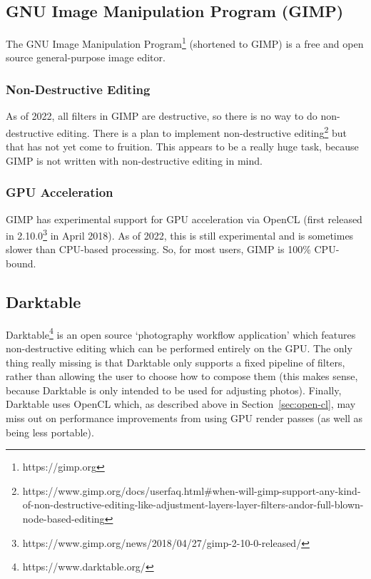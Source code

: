 \documentclass[12pt]{article}
\begin{document}
\subsection{GNU Image Manipulation Program (GIMP)}

The GNU Image Manipulation Program\footnote{https://gimp.org} (shortened to GIMP) is a free and open
source general-purpose image editor.

\subsubsection{Non-Destructive Editing}

As of 2022, all filters in GIMP are destructive, so there is no way to do non-destructive editing.
There is a plan to implement non-destructive
editing\footnote{https://www.gimp.org/docs/userfaq.html\#when-will-gimp-support-any-kind-of-non-destructive-editing-like-adjustment-layers-layer-filters-andor-full-blown-node-based-editing}
but that has not yet come to fruition.  This appears to be a really huge task, because GIMP is not
written with non-destructive editing in mind.

\subsubsection{GPU Acceleration}

GIMP has experimental support for GPU acceleration via OpenCL (first released in
2.10.0\footnote{https://www.gimp.org/news/2018/04/27/gimp-2-10-0-released/} in April 2018).  As of
2022, this is still experimental and is sometimes slower than CPU-based processing.  So, for most
users, GIMP is 100\% CPU-bound.

\subsection{Darktable}

Darktable\footnote{https://www.darktable.org/} is an open source `photography workflow application'
which features non-destructive editing which can be performed entirely on the GPU.  The only thing
really missing is that Darktable only supports a fixed pipeline of filters, rather than allowing the
user to choose how to compose them (this makes sense, because Darktable is only intended to be used
for adjusting photos).  Finally, Darktable uses OpenCL which, as described above in
Section~\ref{sec:open-cl}, may miss out on performance improvements from using GPU render passes (as
well as being less portable).
\end{document}
